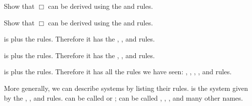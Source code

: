 \documentclass[../../../include/open-logic-section]{subfiles}
\begin{document}
\begin{prob}
Show that $\Box$ can be derived using the  and 
rules.
\end{prob}

\begin{prob}
Show that $\Box$ can be derived using the  and 
rules.
\end{prob}

 is  plus the  rules. Therefore it has the ,
,  and  rules.

 is  plus the  rules. Therefore it has the ,
,  and  rules.

 is  plus the  rules. Therefore it has 
all the rules we have seen: , , , , 
and  rules.

More generally, we can describe systems by listing their rules. 
 is the system given by the , ,  and 
rules.  can be called  or ;  can 
be called , , , and many other names.
\end{document}
